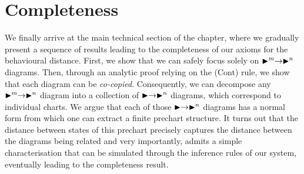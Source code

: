 \section{Completeness}
\label{sec:completeness}
We finally arrive at the main technical section of the chapter, where we gradually present a sequence of results leading to the completeness of our axioms for the behavioural distance. First, we show that we can safely focus solely on $\blacktriangleright^m \to \blacktriangleright^n$ diagrams. Then, through an analytic proof relying on the \textsf{(Cont)} rule, we show that each diagram can be \emph{co-copied}. Consequently, we can decompose any $\blacktriangleright^m \to \blacktriangleright^n$ diagram into a collection of $\blacktriangleright \to \blacktriangleright^n$ diagrams, which correspond to individual charts. We argue that each of those $\blacktriangleright \to \blacktriangleright^n$ diagrams has a normal form from which one can extract a finite prechart structure. It turns out that the distance between states of this prechart precisely captures the distance between the diagrams being related and very importantly, admits a simple characterisation that can be simulated through the inference rules of our system, eventually leading to the completeness result.
